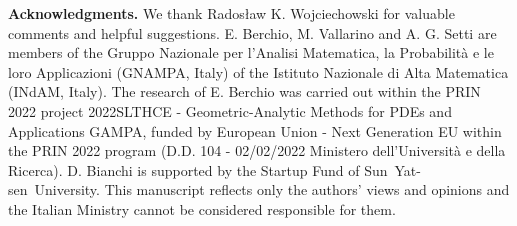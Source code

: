 \documentclass[journal]{article}
\theoremstyle{nonitalic}
\theoremstyle{nonitalic}
\theoremstyle{plain} %
\numberwithin{equation}{section}
\begin{document}
\textbf{Acknowledgments.} We thank Rados{\l}aw K. Wojciechowski   for valuable comments and helpful suggestions. E. Berchio, M. Vallarino and A. G. Setti are members of the Gruppo Nazionale per l'Analisi Matematica, la Probabilit\`a e le loro Applicazioni (GNAMPA, Italy) of the Istituto Nazionale di Alta Matematica (INdAM, Italy). The research of E. Berchio was carried out within the PRIN 2022 project 2022SLTHCE - Geometric-Analytic Methods for PDEs and Applications GAMPA, funded by European Union - Next Generation EU within the PRIN 2022 program (D.D. 104 - 02/02/2022 Ministero dell'Universit\`a e della Ricerca). D. Bianchi is supported by the Startup Fund of Sun~Yat-sen~University.  This manuscript reflects only the authors' views and opinions and the Italian Ministry cannot be considered responsible for them.



\printbibliography
\end{document}

